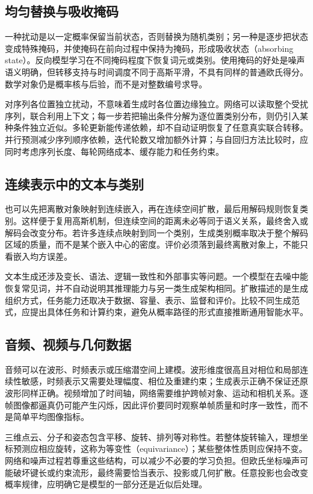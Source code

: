 \documentclass[UTF8,12pt,a4paper,fontset=fandol]{ctexart}
\begin{document}
\subsection{均匀替换与吸收掩码}
一种扰动是以一定概率保留当前状态，否则替换为随机类别；另一种是逐步把状态变成特殊掩码，并使掩码在前向过程中保持为掩码，形成吸收状态（absorbing state）。反向模型学习在不同掩码程度下恢复词元或类别。使用掩码的好处是噪声语义明确，但转移支持与时间调度不同于高斯平滑，不具有同样的普通欧氏得分。数学对象仍是概率核与后验，而不是对整数编号求导。

对序列各位置独立扰动，不意味着生成时各位置边缘独立。网络可以读取整个受扰序列，联合利用上下文；每一步若把输出条件分解为逐位置类别分布，则仍引入某种条件独立近似。多轮更新能传递依赖，却不自动证明恢复了任意真实联合转移。并行预测减少序列顺序依赖，迭代轮数又增加额外计算；与自回归方法比较时，应同时考虑序列长度、每轮网络成本、缓存能力和任务约束。

\subsection{连续表示中的文本与类别}
也可以先把离散对象映射到连续嵌入，再在连续空间扩散，最后用解码规则恢复类别。这样便于复用高斯机制，但连续空间的距离未必等同于语义关系，最终舍入或解码会改变分布。若许多连续点映射到同一个类别，生成类别概率取决于整个解码区域的质量，而不是某个嵌入中心的密度。评价必须落到最终离散对象上，不能只看嵌入均方误差。

文本生成还涉及变长、语法、逻辑一致性和外部事实等问题。一个模型在去噪中能恢复常见词，并不自动说明其推理能力与另一类生成架构相同。扩散描述的是生成组织方式，任务能力还取决于数据、容量、表示、监督和评价。比较不同生成范式，应提出具体任务和计算约束，避免从概率路径的形式直接推断通用智能水平。

\subsection{音频、视频与几何数据}
音频可以在波形、时频表示或压缩潜空间上建模。波形维度很高且对相位和局部连续性敏感，时频表示又需要处理幅度、相位及重建约束；生成表示正确不保证还原波形同样正确。视频增加了时间轴，网络需要维护跨帧对象、运动和相机关系。逐帧图像都逼真仍可能产生闪烁，因此评价要同时观察单帧质量和时序一致性，而不是简单平均图像指标。

三维点云、分子和姿态包含平移、旋转、排列等对称性。若整体旋转输入，理想坐标预测应相应旋转，这称为等变性（equivariance）；某些整体性质则应保持不变。网络和噪声过程若尊重这些结构，可以减少不必要的学习负担。但欧氏坐标噪声可能破坏键长或约束流形，最终需要恰当表示、投影或几何扩散。任意投影也会改变概率规律，应明确它是模型的一部分还是近似后处理。
\end{document}
